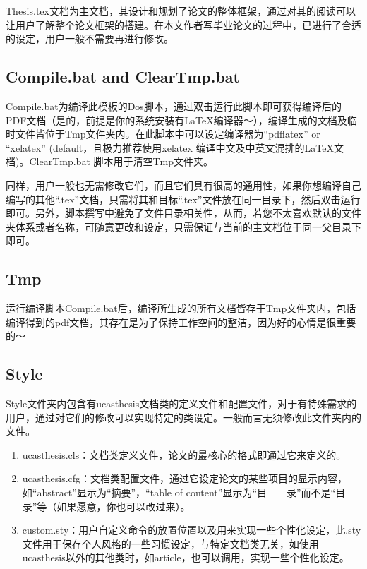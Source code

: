 Thesis.tex文档为主文档，其设计和规划了论文的整体框架，通过对其的阅读可以让用户了解整个论文框架的搭建。在本文作者写毕业论文的过程中，已进行了合适的设定，用户一般不需要再进行修改。

\subsection{Compile.bat and Clear\textunderscore Tmp.bat}

Compile.bat为编译此模板的Dos脚本，通过双击运行此脚本即可获得编译后的PDF文档（是的，前提是你的系统安装有\LaTeX{}编译器～），编译生成的文档及临时文件皆位于Tmp文件夹内。在此脚本中可以设定编译器为“pdflatex” or “xelatex” (default，且极力推荐使用xelatex 编译中文及中英文混排的\LaTeX{}文档)。Clear\textunderscore Tmp.bat 脚本用于清空Tmp文件夹。

同样，用户一般也无需修改它们，而且它们具有很高的通用性，如果你想编译自己编写的其他“.tex”文档，只需将其和目标“.tex”文件放在同一目录下，然后双击运行即可。另外，脚本撰写中避免了文件目录相关性，从而，若您不太喜欢默认的文件夹体系或者名称，可随意更改和设定，只需保证与当前的主文档位于同一父目录下即可。

\subsection{Tmp}

运行编译脚本Compile.bat后，编译所生成的所有文档皆存于Tmp文件夹内，包括编译得到的pdf文档，其存在是为了保持工作空间的整洁，因为好的心情是很重要的～

\subsection{Style}

Style文件夹内包含有ucasthesis文档类的定义文件和配置文件，对于有特殊需求的用户，通过对它们的修改可以实现特定的类设定。一般而言无须修改此文件夹内的文件。

\begin{enumerate}
  \item ucasthesis.cls：文档类定义文件，论文的最核心的格式即通过它来定义的。
  \item ucasthesis.cfg：文档类配置文件，通过它设定论文的某些项目的显示内容，如“abstract”显示为“摘要”，“table of content”显示为“目~~~~录”而不是“目录”等（如果愿意，你也可以改过来）。
  \item custom.sty：用户自定义命令的放置位置以及用来实现一些个性化设定，此.sty文件用于保存个人风格的一些习惯设定，与特定文档类无关，如使用ucasthesis以外的其他类时，如article，也可以调用，实现一些个性化设定。
\end{enumerate}

